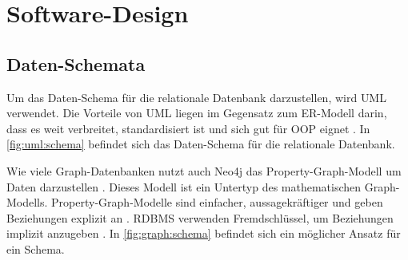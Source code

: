 \section{Software-Design}\label{ch:design}

\subsection{Daten-Schemata}
Um das Daten-Schema für die relationale Datenbank darzustellen, wird \ac{UML} verwendet. Die Vorteile von \ac{UML} liegen im Gegensatz zum \ac{ER-Modell} darin, dass es weit verbreitet, standardisiert ist und sich gut für \ac{OOP} eignet \cite{teorey2011database}. In \autoref{fig:uml:schema} befindet sich das Daten-Schema für die relationale Datenbank.

Wie viele Graph-Datenbanken nutzt auch Neo4j das Property-Graph-Modell um Daten darzustellen  \cite{lal2015neo4j}. Dieses Modell ist ein Untertyp des mathematischen Graph-Modells. Property-Graph-Modelle sind einfacher, aussagekräftiger und geben Beziehungen explizit an  \cite{lal2015neo4j}. \ac{RDBMS} verwenden Fremdschlüssel, um Beziehungen implizit anzugeben \cite{lal2015neo4j}. In \autoref{fig:graph:schema} befindet sich ein möglicher Ansatz für ein Schema.

